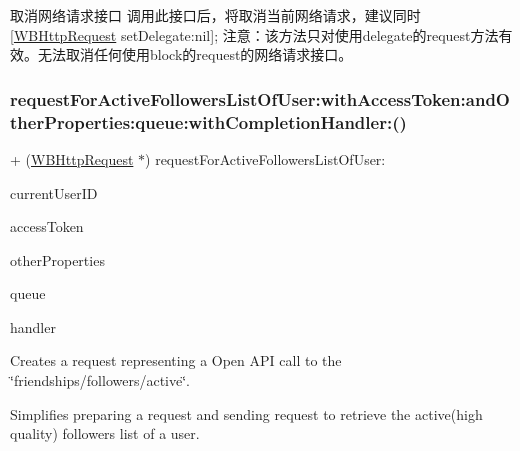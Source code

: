 取消网络请求接口 调用此接口后，将取消当前网络请求，建议同时\mbox{[}\mbox{\hyperlink{interface_w_b_http_request}{W\+B\+Http\+Request}} set\+Delegate\+:nil\mbox{]}; 注意：该方法只对使用delegate的request方法有效。无法取消任何使用block的request的网络请求接口。 \mbox{\label{interface_w_b_http_request_a158110b5d079d1ddd7baae029a8a36fb}} 
\subsubsection{\texorpdfstring{request\+For\+Active\+Followers\+List\+Of\+User\+:with\+Access\+Token\+:and\+Other\+Properties\+:queue\+:with\+Completion\+Handler\+:()}{requestForActiveFollowersListOfUser:withAccessToken:andOtherProperties:queue:withCompletionHandler:()}\hspace{0.1cm}{\footnotesize\ttfamily [1/3]}}
{\footnotesize\ttfamily + (\mbox{\hyperlink{interface_w_b_http_request}{W\+B\+Http\+Request}} $\ast$) request\+For\+Active\+Followers\+List\+Of\+User\+: \begin{DoxyParamCaption}\item[{(N\+S\+String $\ast$)}]{current\+User\+ID }\item[{withAccessToken:(N\+S\+String $\ast$)}]{access\+Token }\item[{andOtherProperties:(N\+S\+Dictionary $\ast$)}]{other\+Properties }\item[{queue:(N\+S\+Operation\+Queue $\ast$)}]{queue }\item[{withCompletionHandler:(W\+B\+Request\+Handler)}]{handler }\end{DoxyParamCaption}}

Creates a request representing a Open A\+PI call to the \char`\"{}friendships/followers/active\char`\"{}.

Simplifies preparing a request and sending request to retrieve the active(high quality) followers list of a user.

